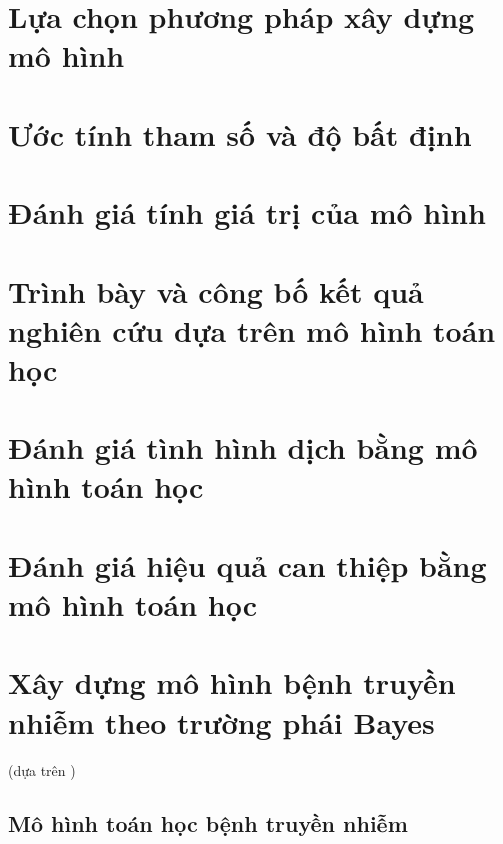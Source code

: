 \documentclass[
]{book}
\begin{document}
\hypertarget{mhth_phuongphap}{%
\chapter{Lựa chọn phương pháp xây dựng mô hình}\label{mhth_phuongphap}}

\hypertarget{mhth_uoctinh}{%
\chapter{Ước tính tham số và độ bất định}\label{mhth_uoctinh}}

\hypertarget{mhth_giatri}{%
\chapter{Đánh giá tính giá trị của mô hình}\label{mhth_giatri}}

\hypertarget{mhth_trinhbay}{%
\chapter{Trình bày và công bố kết quả nghiên cứu dựa trên mô hình toán học}\label{mhth_trinhbay}}

\hypertarget{mhth_danhgiadich}{%
\chapter{Đánh giá tình hình dịch bằng mô hình toán học}\label{mhth_danhgiadich}}

\hypertarget{mhth_hieuquacanthiep}{%
\chapter{Đánh giá hiệu quả can thiệp bằng mô hình toán học}\label{mhth_hieuquacanthiep}}

\hypertarget{BayesDisTransModels}{%
\chapter{Xây dựng mô hình bệnh truyền nhiễm theo trường phái Bayes}\label{BayesDisTransModels}}

(dựa trên \citep{grinsztajn_bayesian_2021})

\hypertarget{muxf4-huxecnh-touxe1n-hux1ecdc-bux1ec7nh-truyux1ec1n-nhiux1ec5m}{%
\section{Mô hình toán học bệnh truyền nhiễm}\label{muxf4-huxecnh-touxe1n-hux1ecdc-bux1ec7nh-truyux1ec1n-nhiux1ec5m}}
\end{document}
